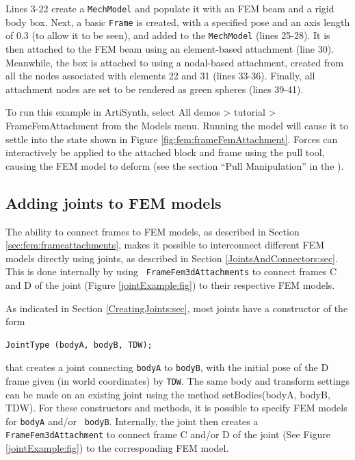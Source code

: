 \lstset{numbers=none} 
Lines 3-22 create a {\tt MechModel} and populate it with an FEM beam
and a rigid body box. Next, a basic {\tt Frame} is created, with a
specified pose and an axis length of 0.3 (to allow it to be seen), and
added to the {\tt MechModel} (lines 25-28). It is then attached to the
FEM beam using an element-based attachment (line 30).  Meanwhile, the
box is attached to using a nodal-based attachment, created from all
the nodes associated with elements 22 and 31 (lines 33-36). Finally,
all attachment nodes are set to be rendered as green spheres (lines
39-41).

To run this example in ArtiSynth, select {\sf All demos > tutorial >
FrameFemAttachment} from the {\sf Models} menu. Running the model will
cause it to settle into the state shown in Figure
\ref{fig:fem:frameFemAttachment}. Forces can interactively
be applied to the attached block and frame using the
pull tool, causing the FEM model to deform 
(see the section ``Pull Manipulation'' in the
).

\subsection{Adding joints to FEM models}

The ability to connect frames to FEM models, as described in Section
\ref{sec:fem:frameattachments}, makes it possible to interconnect
different FEM models directly using joints, as described in Section
\ref{JointsAndConnectors:sec}. This is done internally by using {\tt
FrameFem3dAttachments} to connect frames C and D of the joint (Figure
\ref{jointExample:fig}) to their respective FEM models.

As indicated in Section \ref{CreatingJoints:sec}, most
joints have a constructor of the form
%
\begin{lstlisting}[]
  JointType (bodyA, bodyB, TDW);
\end{lstlisting}
%
that creates a joint connecting {\tt bodyA} to {\tt bodyB}, with the
initial pose of the D frame given (in world coordinates) by {\tt TDW}.
The same body and transform settings can be made on an existing joint
using the method %
{setBodies(bodyA, bodyB, TDW)}.  For these constructors and methods,
it is possible to specify FEM models for {\tt bodyA} and/or {\tt
bodyB}. Internally, the joint then creates a {\tt
FrameFem3dAttachment} to connect frame C and/or D of the joint (See
Figure \ref{jointExample:fig}) to the corresponding FEM model.

